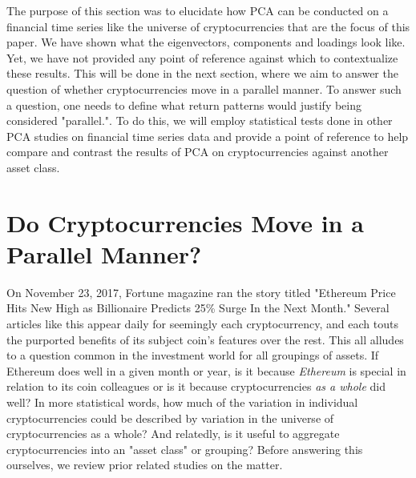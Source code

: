 \documentclass[12pt,twoside]{article}
\begin{document}
The purpose of this section was to elucidate how PCA can be conducted on a financial time series like the universe of cryptocurrencies that are the focus of this paper. We have shown what the eigenvectors, components and loadings look like. Yet, we have not provided any point of reference against which to contextualize these results. This will be done in the next section, where we aim to answer the question of whether cryptocurrencies move in a parallel manner. To answer such a question, one needs to define what return patterns would justify being considered "parallel.". To do this, we will employ statistical tests done in other PCA studies on financial time series data and provide a point of reference to help compare and contrast the results of PCA on cryptocurrencies against another asset class.

\section*{Do Cryptocurrencies Move in a Parallel Manner?}

On November 23, 2017, Fortune magazine ran the story titled "Ethereum Price Hits New High as Billionaire Predicts 25\% Surge In the Next Month." Several articles like this appear daily for seemingly each cryptocurrency, and each touts the purported benefits of its subject coin's features over the rest. This all alludes to a question common in the investment world for all groupings of assets. If Ethereum does well in a given month or year, is it because \textit{Ethereum} is special in relation to its coin colleagues or is it because cryptocurrencies \textit{as a whole} did well? In more statistical words, how much of the variation in individual cryptocurrencies could be described by variation in the universe of cryptocurrencies as a whole? And relatedly, is it useful to aggregate cryptocurrencies into an "asset class" or grouping? Before answering this ourselves, we review prior related studies on the matter.
\end{document}
